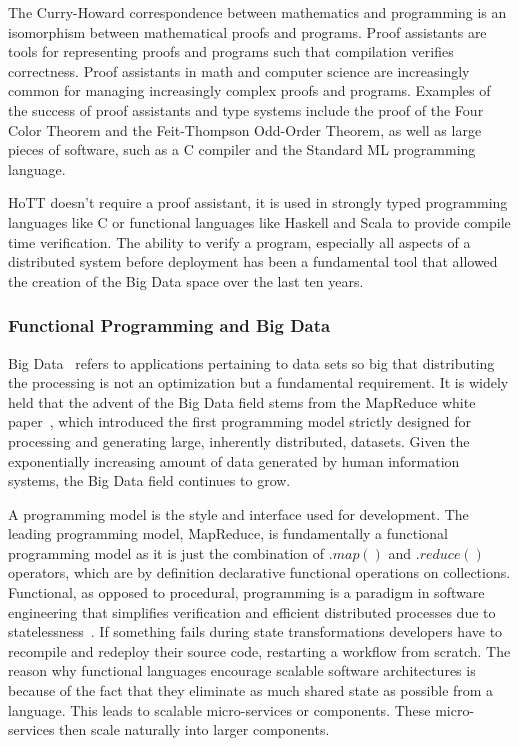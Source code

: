 \documentclass[runningheads]{llncs}
\begin{document}
The Curry-Howard correspondence between mathematics and programming is an isomorphism between mathematical proofs and programs. Proof assistants are tools for representing proofs and programs such that compilation verifies correctness. Proof assistants in math and computer science are increasingly common for managing increasingly complex proofs and programs. Examples of the success of proof assistants and type systems include the proof of the Four Color Theorem and the Feit-Thompson Odd-Order Theorem, as well as large pieces of software, such as a C compiler and the Standard ML programming language.

HoTT doesn't require a proof assistant, it is used in strongly typed programming languages like C or functional languages like Haskell and Scala to provide compile time verification. The ability to verify a program, especially all aspects of a distributed system before deployment has been a fundamental tool that allowed the creation of the Big Data space over the last ten years.

\subsubsection{Functional Programming and Big Data}
Big Data~\cite{ref_article11,ref_book2} refers to applications pertaining to data sets so big that distributing the processing is not an optimization but a fundamental requirement. It is widely held that the advent of the Big Data field stems from the MapReduce white paper~\cite{ref_proc1}, which introduced the first programming model strictly designed for processing and generating large, inherently distributed, datasets. Given the exponentially increasing amount of data generated by human information systems, the Big Data field continues to grow.

A programming model is the style and interface used for development. The leading programming model, MapReduce, is fundamentally a functional programming model as it is just the combination of $.map()$ and $.reduce()$ operators, which are by definition declarative functional operations on collections. Functional, as opposed to procedural, programming is a paradigm in software engineering that simplifies verification and efficient distributed processes due to statelessness~\cite{ref_book3}. If something fails during state transformations developers have to recompile and redeploy their source code, restarting a workflow from scratch. The reason why functional languages encourage scalable software architectures is because of the fact that they eliminate as much shared state as possible from a language. This leads to scalable micro-services or components. These micro-services then scale naturally into larger components.
\end{document}

